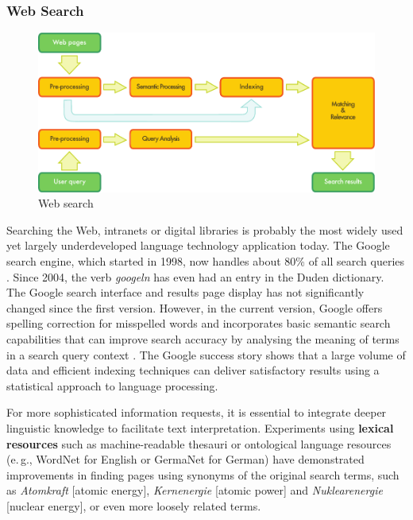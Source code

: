\documentclass[]{../../metanetpaper}
\begin{document}
\begin{multicols}{2}
\subsubsection{Web Search}

\begin{figure}[htb]
  \center
  \includegraphics[width=\textwidth]{../_media/english/web_search_architecture}
  \caption{Web search}
  \label{fig:websearcharch_en}
 \end{figure}

Searching the Web, intranets or digital libraries is probably the most widely used yet largely underdeveloped language technology application today. The Google search engine, which started in 1998, now handles about 80\% of all search queries \cite{spi1}. Since 2004, the verb \textit{googeln} has even had an entry in the Duden dictionary. The Google search interface and results page display has not significantly changed since the first version. However, in the current version, Google offers spelling correction for misspelled words and incorporates basic semantic search capabilities that can improve search accuracy by analysing the meaning of terms in a search query context \cite{pc1}. The Google success story shows that a large volume of data and efficient indexing techniques can deliver satisfactory results using a statistical approach to language processing. 

For more sophisticated information requests, it is essential to integrate deeper linguistic knowledge to facilitate text interpretation. Experiments using \textbf{lexical resources} such as machine-readable thesauri or ontological language resources (e.\,g., WordNet for English or GermaNet for German) have demonstrated improvements in finding pages using synonyms of the original search terms, such as \textit{Atomkraft} {[}atomic energy{]}, \textit{Kernenergie} {[}atomic power{]} and \textit{Nuklearenergie} {[}nuclear energy{]}, or even more loosely related terms.


\end{multicols}
\end{document}
